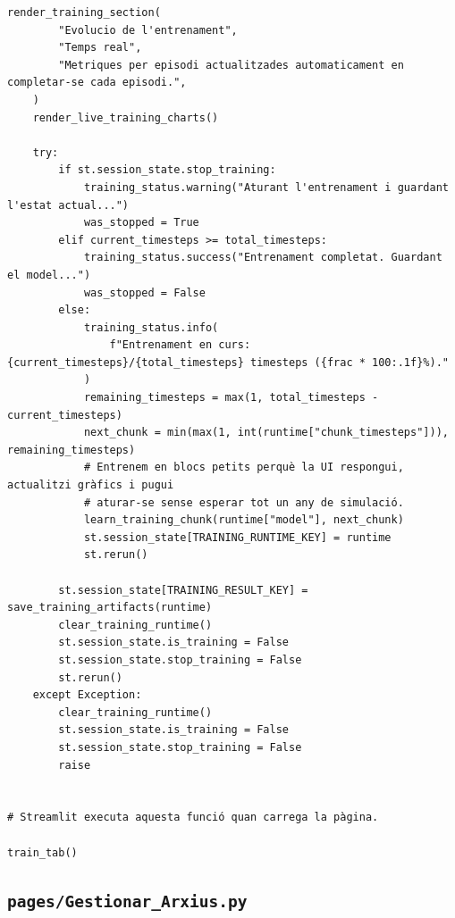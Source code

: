 \documentclass[10pt,a4paper]{article}
\begin{document}
\begin{lstlisting}[style=studioPython,caption={pages/Entrenar\_Agent.py},label={lst:pages-entrenar-agent-py}]
    render_training_section(
        "Evolucio de l'entrenament",
        "Temps real",
        "Metriques per episodi actualitzades automaticament en completar-se cada episodi.",
    )
    render_live_training_charts()

    try:
        if st.session_state.stop_training:
            training_status.warning("Aturant l'entrenament i guardant l'estat actual...")
            was_stopped = True
        elif current_timesteps >= total_timesteps:
            training_status.success("Entrenament completat. Guardant el model...")
            was_stopped = False
        else:
            training_status.info(
                f"Entrenament en curs: {current_timesteps}/{total_timesteps} timesteps ({frac * 100:.1f}%)."
            )
            remaining_timesteps = max(1, total_timesteps - current_timesteps)
            next_chunk = min(max(1, int(runtime["chunk_timesteps"])), remaining_timesteps)
            # Entrenem en blocs petits perquè la UI respongui, actualitzi gràfics i pugui
            # aturar-se sense esperar tot un any de simulació.
            learn_training_chunk(runtime["model"], next_chunk)
            st.session_state[TRAINING_RUNTIME_KEY] = runtime
            st.rerun()

        st.session_state[TRAINING_RESULT_KEY] = save_training_artifacts(runtime)
        clear_training_runtime()
        st.session_state.is_training = False
        st.session_state.stop_training = False
        st.rerun()
    except Exception:
        clear_training_runtime()
        st.session_state.is_training = False
        st.session_state.stop_training = False
        raise


# Streamlit executa aquesta funció quan carrega la pàgina.

train_tab()
\end{lstlisting}


\subsection{\texorpdfstring{\texttt{pages/Gestionar\_Arxius.py}}{pages/Gestionar\_Arxius.py}}
\end{document}
